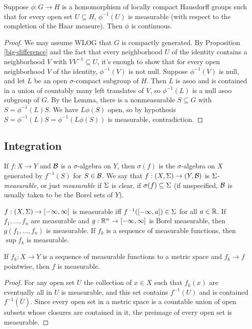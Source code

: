 \begin{thm} Suppose $\phi : G \rightarrow H$ is a homomorphism of locally compact Hausdorff groups such that for every open set $U \subseteq H$, $\phi^{-1}(U)$ is measurable (with respect to the completion of the Haar measure). Then $\phi$ is continuous.
\end{thm}
\begin{proof} We may assume WLOG that $G$ is compactly generated. By Proposition \ref{big-difference} and the fact that every neighborhood $U$ of the identity contains a neighborhood $V$ with $VV^{-1} \subseteq U$, it's enough to show that for every open neighborhood $V$ of the identity, $\phi^{-1}(V)$ is not null. Suppose $\phi^{-1}(V)$ is null, and let $L$ be an open $\sigma$-compact subgroup of $H$. Then $L$ is asoo and is contained in a union of countably many left translates of $V$, so $\phi^{-1}(L)$ is a null asoo subgroup of $G$. By the Lemma, there is a nonmeasurable $S \subseteq G$ with $S = \phi^{-1}(L)S$. We have $L\phi(S)$ open, so by hypothesis $S = \phi^{-1}(L)S = \phi^{-1}(L\phi(S))$ is measurable, contradiction.
\end{proof}

\subsection{Integration}

\begin{defn} If $f:X\rightarrow Y$ and $\mathcal{B}$ is a $\sigma$-algebra on $Y$, then $\sigma(f)$ is the $\sigma$-algebra on $X$ generated by $f^{-1}(S)$ for $S \in \mathcal{B}$. We say that $f:(X,\Sigma) \rightarrow (Y,\mathcal{B})$ is $\Sigma$-\emph{measurable}, or just \emph{measurable} if $\Sigma$ is clear, if $\sigma(f) \subseteq \Sigma$ (if unspecified, $\mathcal{B}$ is usually taken to be the Borel sets of $Y$).
\end{defn}

\begin{prop} $f:(X,\Sigma) \rightarrow [-\infty,\infty]$ is measurable iff $f^{-1}([-\infty,a]) \in \Sigma$ for all $a \in \mathbb{R}$. If $f_1, ..., f_n$ are measurable and $g:\mathbb{R}^n \rightarrow [-\infty,\infty]$ is Borel measurable, then $g(f_1, ..., f_n)$ is measurable. If $f_k$ is a sequence of measurable functions, then $\sup f_k$ is measurable.
\end{prop}

\begin{prop} If $f_k : X \rightarrow Y$ is a sequence of measurable functions to a metric space and $f_k \rightarrow f$ pointwise, then $f$ is measurable.
\end{prop}
\begin{proof} For any open set $U$ the collection of $x \in X$ such that $f_k(x)$ are eventually all in $U$ is measurable, and this set contains $f^{-1}(U)$ and is contained $f^{-1}(\overline{U})$. Since every open set in a metric space is a countable union of open subsets whose closures are contained in it, the preimage of every open set is measurable.
\end{proof}

